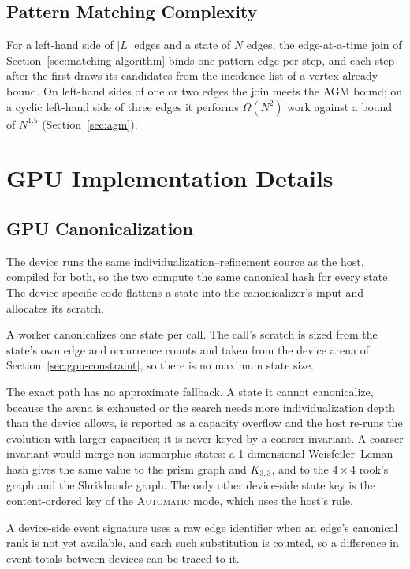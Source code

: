 \documentclass[9pt,twocolumn,a4paper]{extarticle}
\begin{document}
\subsection{Pattern Matching Complexity}

For a left-hand side of $|L|$ edges and a state of $N$ edges, the edge-at-a-time join of
Section~\ref{sec:matching-algorithm} binds one pattern edge per step, and each step after the
first draws its candidates from the incidence list of a vertex already bound. On left-hand sides
of one or two edges the join meets the AGM bound; on a cyclic left-hand side of three edges it
performs $\Omega(N^2)$ work against a bound of $N^{1.5}$ (Section~\ref{sec:agm}).

\section{GPU Implementation Details}
\label{app:gpu-impl}

\subsection{GPU Canonicalization}

The device runs the same individualization--refinement source as the host, compiled for both, so
the two compute the same canonical hash for every state. The device-specific code flattens a state
into the canonicalizer's input and allocates its scratch.

A worker canonicalizes one state per call. The call's scratch is sized from the state's own edge
and occurrence counts and taken from the device arena of Section~\ref{sec:gpu-constraint}, so
there is no maximum state size.

The exact path has no approximate fallback. A state it cannot canonicalize, because the arena is
exhausted or the search needs more individualization depth than the device allows, is reported as
a capacity overflow and the host re-runs the evolution with larger capacities; it is never keyed
by a coarser invariant. A coarser invariant would merge non-isomorphic states: a 1-dimensional
Weisfeiler--Leman hash gives the same value to the prism graph and $K_{3,3}$, and to the
$4 \times 4$ rook's graph and the Shrikhande graph. The only other device-side state key is the
content-ordered key of the \textsc{Automatic} mode, which uses the host's rule.

A device-side event signature uses a raw edge identifier when an edge's canonical rank is not yet
available, and each such substitution is counted, so a difference in event totals between devices
can be traced to it.
\end{document}
